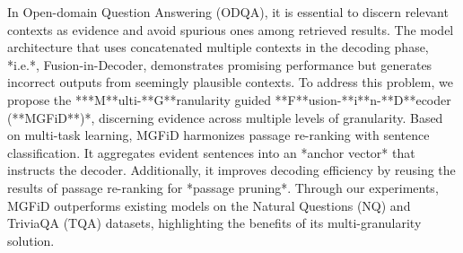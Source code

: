 In Open-domain Question Answering (ODQA), it is essential to discern relevant contexts as evidence and avoid spurious ones among retrieved results. The model architecture that uses concatenated multiple contexts in the decoding phase, *i.e.*, Fusion-in-Decoder, demonstrates promising performance but generates incorrect outputs from seemingly plausible contexts. To address this problem, we propose the ***M**ulti-**G**ranularity guided **F**usion-**i**n-**D**ecoder (**MGFiD**)*, discerning evidence across multiple levels of granularity. Based on multi-task learning, MGFiD harmonizes passage re-ranking with sentence classification. It aggregates evident sentences into an *anchor vector* that instructs the decoder. Additionally, it improves decoding efficiency by reusing the results of passage re-ranking for *passage pruning*. Through our experiments, MGFiD outperforms existing models on the Natural Questions (NQ) and TriviaQA (TQA) datasets, highlighting the benefits of its multi-granularity solution.